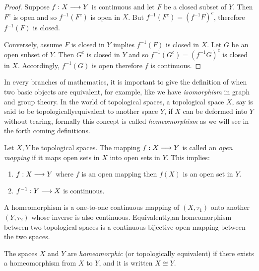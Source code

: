 \begin{proof}
    Suppose $f : X \longrightarrow Y$ is continuous and let $F$ be a closed subset of $Y$. Then $F^c$ is open and so $f^{-1}(F^c)$ is open in $X$. But $f^{-1}(F^c) = (f^{-1} F)^c$, therefore $f^{-1}(F)$ is closed.

    Conversely, assume $F$ is closed in $Y$ implies $f^{-1}(F)$ is closed in $X$. Let $G$ be an open subset of $Y$. Then $G^c$ is closed in $Y$ and so $f^{-1}(G^c) = (f^{-1}G)^c$ is closed in $X$. Accordingly, $f^{-1}(G)$ is open therefore $f$ is continuous.
\end{proof}

In every branches of mathematics, it is important to give the definition of when two basic objects are equivalent, for example, like we have \textit{isomorphism} in graph and group theory. In the world of topological spaces, a topological space $X$, say is said to be topologicallyequivalent to another space $Y$, if $X$ can be deformed into $Y$ without tearing, formally this concept is called \textit{homeomorphism} as we will see in the forth coming definitions.

\begin{defn}
    Let $X,Y$ be topological spaces. The mapping $f: X \longrightarrow Y$ is called an \textit{open mapping} if it maps open sets in $X$ into open sets in $Y$. This implies:
    \begin{enumerate}
        \item $f: X \longrightarrow Y$ where $f$ is an open mapping then $f(X)$ is an open set in $Y$.
        \item $f^{-1}: Y \longrightarrow X$ is continuous. 
    \end{enumerate}
\end{defn}

\begin{defn}[Homeomorphism]
    A homeomorphism is a one-to-one continuous mapping of $(X, \tau_1)$ onto another $(Y, \tau_2)$ whose inverse is also continuous.\newline
    Equivalently,an homeomorphism between two topological spaces is a continuous bijective open mapping between the two spaces.
\end{defn}
The spaces $X$ and $Y$ are \textit{homeomorphic} (or topologically equivalent) if there exists a homeomorphism from $X$ to $Y$, and it is written $X \cong Y$.

